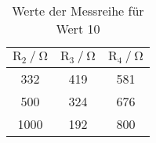 \begin{table}[H]
  \centering
  \caption{Werte der Messreihe für Wert 10}
  \label{tab:tabe1}
    \begin{tabular}{c c c}
    \toprule
    $ \text{R}_2 \: / \: \si{\ohm} $ & $\text{R}_3 \: / \: \si{\ohm} $ &
    $\text{R}_4 \: / \: \si{\ohm} $ \\
    \midrule
    332 & 419 & 581 \\
    500 & 324 & 676 \\
    1000 & 192 & 800 \\
    \bottomrule
    \end{tabular}
\end{table}
